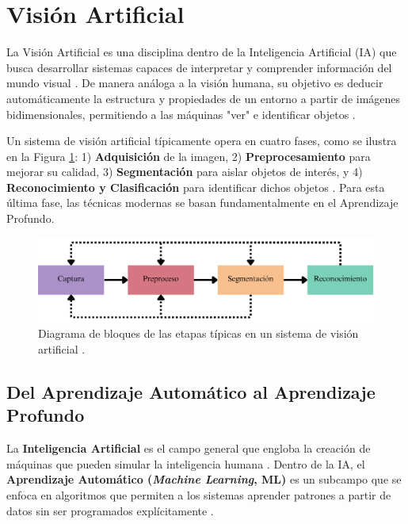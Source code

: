 \section{Visión Artificial}
\label{sec:vision_artificial}

La Visión Artificial es una disciplina dentro de la Inteligencia Artificial (IA) que busca desarrollar sistemas capaces de interpretar y comprender información del mundo visual \cite{szeliski2010computer}. De manera análoga a la visión humana, su objetivo es deducir automáticamente la estructura y propiedades de un entorno a partir de imágenes bidimensionales, permitiendo a las máquinas "ver" e identificar objetos \cite{visionartificialunirioja}.

Un sistema de visión artificial típicamente opera en cuatro fases, como se ilustra en la Figura \ref{fig:proceso_vision}: 1) \textbf{Adquisición} de la imagen, 2) \textbf{Preprocesamiento} para mejorar su calidad, 3) \textbf{Segmentación} para aislar objetos de interés, y 4) \textbf{Reconocimiento y Clasificación} para identificar dichos objetos \cite{visionporcomputador}. Para esta última fase, las técnicas modernas se basan fundamentalmente en el Aprendizaje Profundo.

\begin{figure}[h!]
    \centering
    \includegraphics[width=0.8\linewidth]{Documento/Imagenes/Marco Teorico/Dig_blo_VA.pdf}
    \caption{Diagrama de bloques de las etapas típicas en un sistema de visión artificial \cite{visionporcomputador}.}
    \label{fig:proceso_vision}
\end{figure}

\subsection{Del Aprendizaje Automático al Aprendizaje Profundo}
\label{subsec:ml_dl}

La \textbf{Inteligencia Artificial} es el campo general que engloba la creación de máquinas que pueden simular la inteligencia humana \cite{iaunam}. Dentro de la IA, el \textbf{Aprendizaje Automático (\textit{Machine Learning}, ML)} es un subcampo que se enfoca en algoritmos que permiten a los sistemas aprender patrones a partir de datos sin ser programados explícitamente \cite{sanchez2020evaluacion}.

